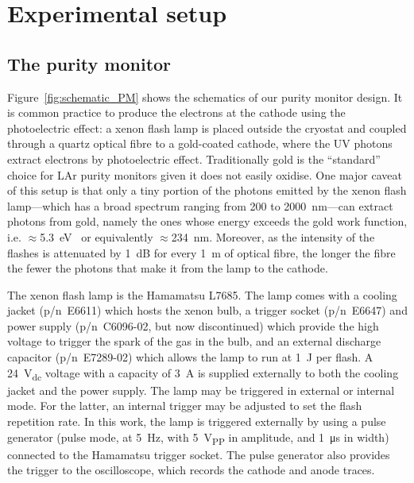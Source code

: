 \documentclass[a4paper,11pt]{article}
\begin{document}
\section{Experimental setup}
\label{sec:experimental_setup}
\subsection{The purity monitor}

Figure~\ref{fig:schematic_PM} shows the schematics of our purity monitor design.
It is common practice to produce the electrons at the cathode using the photoelectric effect: a xenon flash lamp is placed outside the cryostat and coupled through a quartz optical fibre to a gold-coated cathode, where the UV photons extract electrons by photoelectric effect. Traditionally gold is the ``standard'' choice for LAr purity monitors given it does not easily oxidise.
One major caveat of this setup is that only a tiny portion of the photons emitted by the xenon flash lamp---which has a broad spectrum ranging from 200 to \SI{2000}{nm}---can extract photons from gold, namely the ones whose energy exceeds the gold work function, i.e. $\approx$\SI{5.3}{\eV}~\cite{SACHTLER1966221} or equivalently $\approx$\SI{234}{nm}. Moreover, as the intensity of the flashes is attenuated by \SI{1}{\dB} for every \SI{1}{m} of optical fibre, the longer the fibre the fewer the photons that make it from the lamp to the cathode. 

The xenon flash lamp is the Hamamatsu L7685. The lamp comes with a cooling jacket (p/n~E6611) which hosts the xenon bulb, a trigger socket (p/n~E6647) and power supply (p/n~C6096-02, but now discontinued) which provide the high voltage to trigger the spark of the gas in the bulb, and an external discharge capacitor (p/n~E7289-02) which allows the lamp to run at \SI{1}{\joule} per flash. A \SI{24}{V_{dc}} voltage with a capacity of \SI{3}{A} is supplied externally to both the cooling jacket and the power supply. The lamp may be triggered in external or internal mode. For the latter, an internal trigger may be adjusted to set the flash repetition rate. In this work, the lamp is triggered externally by using a pulse generator (pulse mode, at \SI{5}{Hz}, with \SI{5}{V_{PP}} in amplitude, and \SI{1}{\micro s} in width) connected to the Hamamatsu trigger socket. The pulse generator also provides the trigger to the oscilloscope, which records the cathode and anode traces. 
\end{document}
